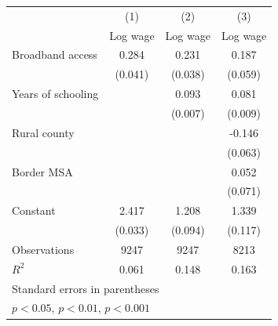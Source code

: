 \begin{tabular}{l*{3}{c}}
\toprule
                    &\multicolumn{1}{c}{(1)}&\multicolumn{1}{c}{(2)}&\multicolumn{1}{c}{(3)}\\
                    &\multicolumn{1}{c}{Log wage}&\multicolumn{1}{c}{Log wage}&\multicolumn{1}{c}{Log wage}\\
\midrule
Broadband access    &       0.284\sym{***}&       0.231\sym{***}&       0.187\sym{**} \\
                    &     (0.041)         &     (0.038)         &     (0.059)         \\
Years of schooling  &                     &       0.093\sym{***}&       0.081\sym{***}\\
                    &                     &     (0.007)         &     (0.009)         \\
Rural county        &                     &                     &      -0.146\sym{*}  \\
                    &                     &                     &     (0.063)         \\
Border MSA          &                     &                     &       0.052         \\
                    &                     &                     &     (0.071)         \\
Constant            &       2.417\sym{***}&       1.208\sym{***}&       1.339\sym{***}\\
                    &     (0.033)         &     (0.094)         &     (0.117)         \\
\midrule
Observations        &        9247         &        9247         &        8213         \\
\(R^{2}\)           &       0.061         &       0.148         &       0.163         \\
\bottomrule
\multicolumn{4}{l}{\footnotesize Standard errors in parentheses}\\
\multicolumn{4}{l}{\footnotesize \sym{*} \(p<0.05\), \sym{**} \(p<0.01\), \sym{***} \(p<0.001\)}\\
\end{tabular}
